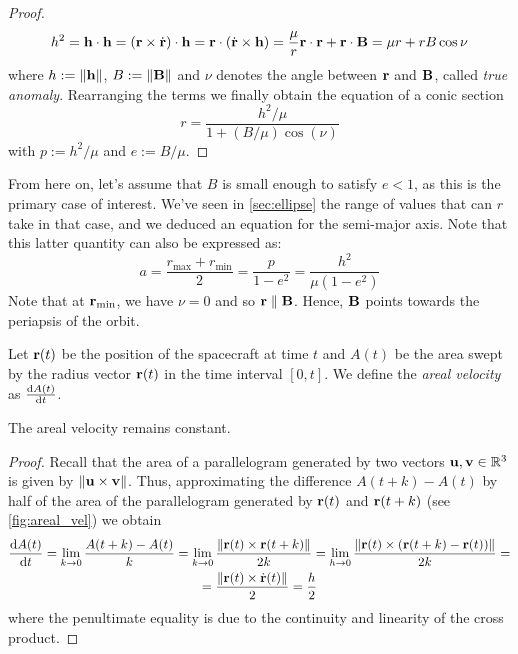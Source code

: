 \documentclass[../main.tex]{subfiles}
\begin{document}
\begin{proof}
  \begin{equation}
    h^2=\boldsymbol{\mathrm{h}}\cdot\boldsymbol{\mathrm{h}}=(\boldsymbol{\mathrm{r}}\times\dot{\boldsymbol{\mathrm{r}}})\cdot\boldsymbol{\mathrm{h}}=\boldsymbol{\mathrm{r}}\cdot(\dot{\boldsymbol{\mathrm{r}}}\times\boldsymbol{\mathrm{h}})=\frac{\mu}{r}\boldsymbol{\mathrm{r}}\cdot\boldsymbol{\mathrm{r}}+\boldsymbol{\mathrm{r}}\cdot\boldsymbol{\mathrm{B}}=\mu r+rB\cos\nu
  \end{equation}
  where $h:=\left\|\boldsymbol{\mathrm{h}}\right\|$, $B:=\left\|\boldsymbol{\mathrm{B}}\right\|$ and $\nu$ denotes the angle between $\boldsymbol{\mathrm{r}}$ and $\boldsymbol{\mathrm{B}}$, called \emph{true anomaly}. Rearranging the terms we finally obtain the equation of a conic section
  \begin{equation}\label{eq:r_conic}
    r=\frac{h^2/\mu}{1+(B/\mu)\cos(\nu)}
  \end{equation}
  with $p:=h^2/\mu$ and $e:=B/\mu$.
\end{proof}
From here on, let's assume that $B$ is small enough to satisfy $e <1$, as this is the primary case of interest. We've seen in \cref{sec:ellipse} the range of values that can $r$ take in that case, and we deduced an equation for the semi-major axis. Note that this latter quantity can also be expressed as:
\begin{equation}\label{eq:semi-major_axis}
  a=\frac{r_\mathrm{max}+r_\mathrm{min}}{2}=\frac{p}{1-e^2}=\frac{h^2}{\mu(1-e^2)}
\end{equation}
Note that at $\boldsymbol{\mathrm{r}}_\mathrm{min}$, we have $\nu=0$ and so $\boldsymbol{\mathrm{r}}\parallel\boldsymbol{\mathrm{B}}$. Hence, $\boldsymbol{\mathrm{B}}$ points towards the periapsis of the orbit.
\begin{definition}
  Let $\boldsymbol{\mathrm{r}}(t)$ be the position of the spacecraft at time $t$ and $A(t)$ be the area swept by the radius vector $\boldsymbol{\mathrm{r}}(t)$ in the time interval $[0,t]$. We define the \emph{areal velocity} as $\dv{A(t)}{t}$.
\end{definition}
\begin{proposition}
  The areal velocity remains constant.
\end{proposition}
\begin{proof}
  Recall that the area of a parallelogram generated by two vectors $\boldsymbol{\mathrm{u}},\boldsymbol{\mathrm{v}}\in\mathbb{R}^3$ is given by $\left\|\boldsymbol{\mathrm{u}}\times\boldsymbol{\mathrm{v}}\right\|$. Thus, approximating the difference $A(t+k)-A(t)$ by half of the area of the parallelogram generated by $\boldsymbol{\mathrm{r}}(t)$ and ${\boldsymbol{\mathrm{r}}}(t+k)$ (see \cref{fig:areal_vel}) we obtain
  \begin{multline}\label{eq:areal_velocity}
    \dv{A(t)}{t}=\lim_{k\to 0}\frac{A(t+k)-A(t)}{k}=\lim_{k\to 0}\frac{\left\|\boldsymbol{\mathrm{r}}(t)\times\boldsymbol{\mathrm{r}}(t+k)\right\|}{2k}=\lim_{h\to 0}\frac{\left\|\boldsymbol{\mathrm{r}}(t)\times(\boldsymbol{\mathrm{r}}(t+k)-\boldsymbol{\mathrm{r}}(t))\right\|}{2k}=\\
    =\frac{\left\|\boldsymbol{\mathrm{r}}(t)\times\dot{\boldsymbol{\mathrm{r}}}(t)\right\|}{2}=\frac{h}{2}
  \end{multline}
  where the penultimate equality is due to the continuity and linearity of the cross product.
\end{proof}
\end{document}
